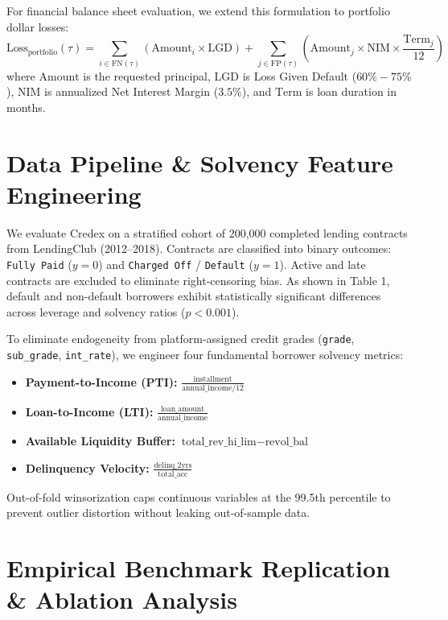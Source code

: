 \documentclass[11pt,a4paper]{article}
\begin{document}
For financial balance sheet evaluation, we extend this formulation to portfolio dollar losses:
\begin{equation}
\text{Loss}_{\text{portfolio}}(\tau) = \sum_{i \in \text{FN}(\tau)} \left( \text{Amount}_i \times \text{LGD} \right) + \sum_{j \in \text{FP}(\tau)} \left( \text{Amount}_j \times \text{NIM} \times \frac{\text{Term}_j}{12} \right)
\end{equation}
where $\text{Amount}$ is the requested principal, $\text{LGD}$ is Loss Given Default ($60\% - 75\%$), $\text{NIM}$ is annualized Net Interest Margin ($3.5\%$), and $\text{Term}$ is loan duration in months.

\section{Data Pipeline \& Solvency Feature Engineering}
We evaluate Credex on a stratified cohort of 200,000 completed lending contracts from LendingClub (2012--2018). Contracts are classified into binary outcomes: \texttt{Fully Paid} ($y=0$) and \texttt{Charged Off} / \texttt{Default} ($y=1$). Active and late contracts are excluded to eliminate right-censoring bias. As shown in Table 1, default and non-default borrowers exhibit statistically significant differences across leverage and solvency ratios ($p < 0.001$).



To eliminate endogeneity from platform-assigned credit grades (\texttt{grade}, \texttt{sub\_grade}, \texttt{int\_rate}), we engineer four fundamental borrower solvency metrics:
\begin{itemize}
    \item \textbf{Payment-to-Income (PTI):} $\frac{\text{installment}}{\text{annual\_income} / 12}$
    \item \textbf{Loan-to-Income (LTI):} $\frac{\text{loan\_amount}}{\text{annual\_income}}$
    \item \textbf{Available Liquidity Buffer:} $\text{total\_rev\_hi\_lim} - \text{revol\_bal}$
    \item \textbf{Delinquency Velocity:} $\frac{\text{delinq\_2yrs}}{\text{total\_acc}}$
\end{itemize}

Out-of-fold winsorization caps continuous variables at the 99.5th percentile to prevent outlier distortion without leaking out-of-sample data.

\section{Empirical Benchmark Replication \& Ablation Analysis}
\end{document}
